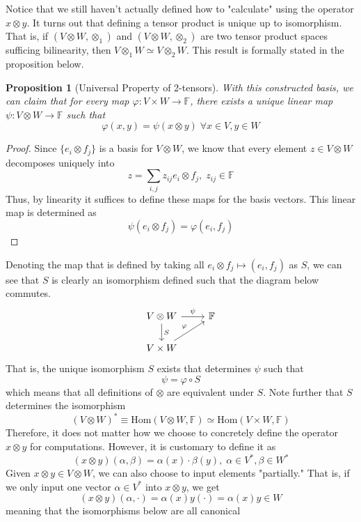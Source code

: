 \documentclass{article}
\newtheorem{proposition}[theorem]{Proposition}
\theoremstyle{remark}
\theoremstyle{definition}
\begin{document}
Notice that we still haven't actually defined how to "calculate" using the operator $x \otimes y$. It turns out that defining a tensor product is unique up to isomorphism. That is, if $(V \otimes W, \otimes_1)$ and $(V \otimes W, \otimes_2)$ are two tensor product spaces sufficing bilinearity, then $V \otimes_1 W \simeq V \otimes_2 W$. This result is formally stated in the proposition below. 

\begin{proposition}[Universal Property of 2-tensors]
With this constructed basis, we can claim that for every map $\varphi: V \times W \longrightarrow \mathbb{F}$, there exists a unique linear map $\psi: V \otimes W \longrightarrow \mathbb{F}$ such that 
\[\varphi (x, y) = \psi (x \otimes y) \; \forall x \in V, y \in W\]
\end{proposition}
\begin{proof}
Since $\{e_i \otimes f_j\}$ is a basis for $V \otimes W$, we know that every element $z \in V \otimes W$ decomposes uniquely into 
\[z = \sum_{i, j} z_{i j} e_i \otimes f_j, \; z_{i j} \in \mathbb{F}\]
Thus, by linearity it suffices to define these maps for the basis vectors. This linear map is determined as 
\[\psi (e_i \otimes f_j) = \varphi (e_i, f_j)\]
\end{proof}
Denoting the map that is defined by taking all $e_i \otimes f_j \mapsto (e_i, f_j)$ as $S$, we can see that $S$ is clearly an isomorphism defined such that the diagram below commutes. 
\[\begin{tikzcd}
    V \otimes W \arrow{r}{\psi} \arrow{d}{S} & \mathbb{F} \\
    V \times W \arrow{ru}{\varphi}
\end{tikzcd}\]
That is, the unique isomorphism $S$ exists that determines $\psi$ such that 
\[\psi = \varphi \circ S \] 
which means that all definitions of $\otimes$ are equivalent under $S$. Note further that $S$ determines the isomorphism 
\[(V \otimes W)^* \equiv \text{Hom}(V \otimes W, \mathbb{F}) \simeq \text{Hom}(V \times W, \mathbb{F})\]
Therefore, it does not matter how we choose to concretely define the operator $x \otimes y$ for computations. However, it is customary to define it as
\[(x \otimes y) (\alpha, \beta) = \alpha (x) \cdot \beta (y), \; \alpha \in V^*, \beta \in W^*\]
Given $x \otimes y \in V \otimes W$, we can also choose to input elements "partially." That is, if we only input one vector $\alpha \in V^*$ into $x \otimes y$, we get
\[(x \otimes y) (\alpha, \cdot) = \alpha(x) y (\cdot) = \alpha (x) y \in W\]
meaning that the isomorphisms below are all canonical
\end{document}

